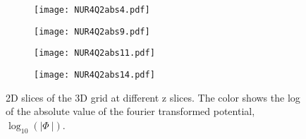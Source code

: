 \begin{figure}[ht]
    \begin{subfigure}{.49\textwidth}
       \centering
    \texttt{[image: NUR4Q2abs4.pdf]}
    \centering
    \label{}
    \end{subfigure}
    \hfill
    \begin{subfigure}{.49\textwidth}
       \centering
    \texttt{[image: NUR4Q2abs9.pdf]}
    \centering
    \label{}
    \end{subfigure}
     \begin{subfigure}{.49\textwidth}
       \centering
    \texttt{[image: NUR4Q2abs11.pdf]}
    \centering
    \label{}
    \end{subfigure}
     \begin{subfigure}{.49\textwidth}
       \centering
    \texttt{[image: NUR4Q2abs14.pdf]}
    \centering
    \label{}
    \end{subfigure}
    \caption{2D slices of the 3D grid at different z slices. The color shows the log of the absolute value of the fourier transformed potential, $\log_{10}(|\Phi^{~}|)$.}
    \label{fig:fig23}
\end{figure}
